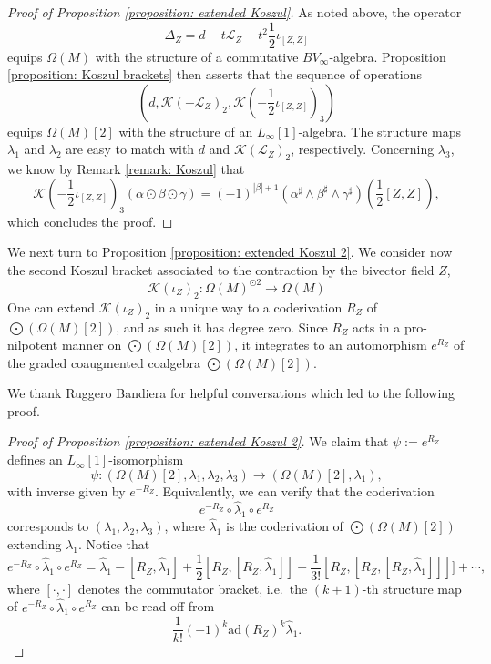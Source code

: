 \documentclass[11pt,thmsa]{amsart}
\theoremstyle{definition}
\newcommand{\Lie}{\mathcal{L}}
\newcommand{\Koszul}{\mathcal{K}}
\begin{document}
{\begin{proof}[Proof of Proposition \ref{proposition: extended Koszul}]
As noted above, the operator
$$ \Delta_Z=d - t\Lie_Z - t^2\frac{1}{2}\iota_{[Z,Z]}$$
equips $\Omega(M)$ with the structure of a commutative $BV_\infty$-algebra.
Proposition \ref{proposition: Koszul brackets} then asserts that the sequence of operations
$$(d,\Koszul(-\Lie_Z)_2,\Koszul(-\frac{1}{2}\iota_{[Z,Z]})_3)$$
equips $\Omega(M)[2]$ with the structure of an $L_\infty[1]$-algebra.
The structure maps $\lambda_1$ and $\lambda_2$ are easy to match with $d$ and $\Koszul(\Lie_Z)_2$, respectively.
Concerning $\lambda_3$, we know by Remark \ref{remark: Koszul} that
$$ \Koszul(-\frac{1}{2}\iota_{[Z,Z]})_3(\alpha\odot \beta\odot\gamma)= (-1)^{|\beta|+1}(\alpha^\sharp \wedge \beta^\sharp \wedge \gamma^\sharp)(\frac{1}{2}[Z,Z]),$$
which concludes the proof.
\end{proof}

We next turn to Proposition \ref{proposition: extended Koszul 2}.
We consider now the second Koszul bracket associated to the contraction by the bivector field $Z$,
$$\Koszul(\iota_Z)_2: \Omega(M)^{\odot 2} \to \Omega(M)$$
 One can extend $\Koszul(\iota_Z)_2$ in a unique way to a coderivation $R_Z$ of $\bigodot(\Omega(M)[2])$, and as such it has degree zero.
Since $R_Z$ acts in a pro-nilpotent manner on $\bigodot(\Omega(M)[2])$, it integrates to an automorphism $e^{R_Z}$ of the graded coaugmented coalgebra $\bigodot(\Omega(M)[2])$.

We thank Ruggero Bandiera for helpful conversations which led to the following proof.


\begin{proof}[Proof of Proposition \ref{proposition: extended Koszul 2}]
We claim that $\psi:=e^{R_Z}$ defines an $L_\infty[1]$-isomorphism
$$ \psi: (\Omega(M)[2],\lambda_1,\lambda_2,\lambda_3) \to (\Omega(M)[2],\lambda_1),$$
with inverse given by $e^{-R_Z}$.
Equivalently, we can verify that the coderivation
$$ e^{-R_Z}\circ \widehat{\lambda}_1 \circ e^{R_Z}$$
corresponds to $(\lambda_1,\lambda_2,\lambda_3)$, where  $\widehat{\lambda}_1$ is the coderivation of $\bigodot(\Omega(M)[2])$ extending $\lambda_1$.
Notice that
$$ e^{-R_{Z}}\circ \widehat{\lambda}_1 \circ e^{R_{Z}} = \widehat{\lambda}_1 - [R_{Z},\widehat{\lambda}_1] + \frac{1}{2}[R_{Z},[R_{Z},\widehat{\lambda}_1]] - \frac{1}{3!}[R_{Z},[R_{Z},[R_{Z},\widehat{\lambda}_1]]]]+\cdots,$$
where $[\cdot,\cdot]$ denotes the commutator bracket, 
i.e.~the $(k+1)$-th structure map of $ e^{-R_Z}\circ \widehat{\lambda}_1 \circ e^{R_Z}$ can be read off from
$$ \frac{1}{k!} (-1)^k \mathrm{ad}(R_{Z})^k\widehat{\lambda}_1.$$


\end{proof}}
\end{document}
